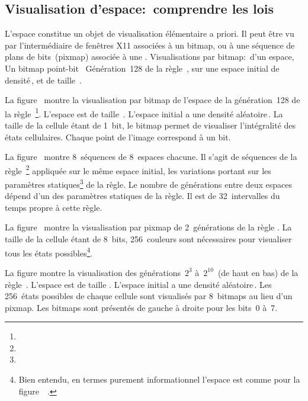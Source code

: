 \subsection{Visualisation d'espace:~comprendre les lois}

L'espace constitue un objet de visualisation élémentaire a priori. %
Il peut être vu par l'intermédiaire de fenêtres X11 associées à un
bitmap, ou à une séquence de plans de bits~(pixmap) associée à une
.
%
{Visualisations par bitmap:~d'un espace,}%
{Un bitmap point-bit~}%
{Génération~128 de la règle~, sur une espace initial de
  densité\,\Sundemi, et de taille~.}

\noindent%
La figure~ montre la visualisation par
bitmap de l'espace de la géné\-ration~128 de la
règle~\footnote{%
  }. %
L'espace est de taille~. %
L'espace initial a une densité aléatoire\,\undemi. %
La taille de la cellule étant de 1~bit, le bitmap permet de visualiser
l'intégralité des états cellulaires. %
Chaque point de l'image correspond à un bit.

\noindent%
La figure~ montre 8~séquences de
8~espaces chacune. %
Il s'agit de séquences de la règle~\footnote{%
  } %
appliquée sur le même espace initial, les variations portant sur les
paramètres statiques\footnote{%
  } %
de la règle. %
Le nombre de générations entre deux espaces dépend d'un des paramètres
statiques de la règle. %
Il est de 32~intervalles du temps propre à cette règle.

\noindent%
La figure~ montre la visualisation par pixmap de
2~générations de la règle  . %
La taille de la cellule étant de 8~bits, 256~couleurs sont nécessaires
pour visualiser tous les états possibles\footnote{%
  Bien entendu, en termes purement informationnel l'espace est comme
  pour la  figure~~.}.

\noindent%
La figure  montre la visualisation des
générations~$2^{3}$ à~$2^{10}$~(de haut en bas) de la
règle~. %
L'espace est de taille . %
L'espace initial a une densité aléatoire\,\undemi. %
Les 256~états possibles de chaque cellule sont visualisés par
8~bitmaps au lieu d'un pixmap. %
Les bitmaps sont présentés de gauche à droite pour les bits~0 à~7.

